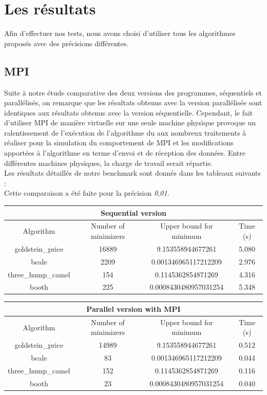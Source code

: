 \documentclass[a4paper,10pt]{article}
\begin{document}
\newpage
\section{Les résultats}
Afin d'effectuer nos tests, nous avons choisi d'utiliser tous les algorithmes proposés avec des précisions différentes.

\subsection{MPI}

Suite à notre étude comparative des deux versions des programmes, séquentiels et parallélisés, on remarque que les résultats obtenus avec la version parallélisée sont identiques aux résultats obtenus avec la version séquentielle. 
Cependant, le fait d'utiliser MPI de manière virtuelle sur une seule machine physique provoque un ralentissement de l'exécution de l'algorithme du aux nombreux traitements à réaliser pour la simulation du comportement de MPI et les modifications apportées à l'algorithme en terme d'envoi et de réception des données. Entre différentes machines physiques, la charge de travail serait répartie. \\

Les résultats détaillés de notre benchmark sont donnés dans les tableaux suivants : \\

Cette comparaison a été faite pour la précision \emph{0,01}.

\begin{tabular}{|c|c|c|c|}
\hline
\multicolumn{4}{|c|}{Sequential version}\\
\hline
Algorithm & Number of minimizers & Upper bound for minimum & Time (s) \\
\hline
goldstein\_price & 16889 & 9.153558944677261 & 5.080\\
\hline
beale & 2209 & 0.001346965117212209 & 2.976\\
\hline
three\_hump\_camel & 154 & 0.1145362854871269 & 4.316\\
\hline
booth & 225 & 0.0008430480957031254 & 5.348\\
\hline
\end{tabular}

\begin{tabular}{|c|c|c|c|}
\hline
\multicolumn{4}{|c|}{Parallel version with MPI}\\
\hline
Algorithm & Number of minimizers & Upper bound for minimum & Time (s) \\
\hline
goldstein\_price & 14989 & 9.153558944677261 & 0.512\\
\hline
beale & 83 & 0.001346965117212209 & 0.044\\
\hline
three\_hump\_camel & 152 & 0.1145362854871269 & 0.116\\
\hline
booth & 23 & 0.0008430480957031254 & 0.040\\
\hline
\end{tabular}
\end{document}
